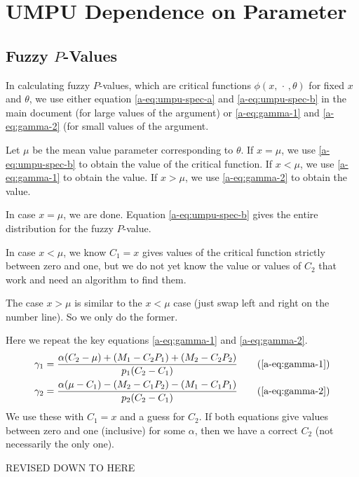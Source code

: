 \documentclass[11pt]{article}
\newcommand{\fatdot}{\,\cdot\,}
\newcommand{\REVISED}{\begin{center} \LARGE REVISED DOWN TO HERE \end{center}}
\begin{document}
\section{UMPU Dependence on Parameter}

\subsection{Fuzzy $P$-Values}

In calculating fuzzy $P$-values, which are critical functions
$\phi(x, \fatdot, \theta)$ for fixed $x$ and $\theta$,
we use either equation \eqref{a-eq:umpu-spec-a} and \eqref{a-eq:umpu-spec-b}
in the main document (for large values of the argument) or
\eqref{a-eq:gamma-1} and \eqref{a-eq:gamma-2} (for small values of the
argument.

Let $\mu$ be the mean value parameter corresponding to $\theta$.
If $x = \mu$, we use \eqref{a-eq:umpu-spec-b} to obtain the value
of the critical function.
If $x < \mu$, we use \eqref{a-eq:gamma-1} to obtain the value.
If $x > \mu$, we use \eqref{a-eq:gamma-2} to obtain the value.

In case $x = \mu$, we are done.  Equation \eqref{a-eq:umpu-spec-b} gives
the entire distribution for the fuzzy $P$-value.

In case $x < \mu$, we know $C_1 = x$ gives values of the critical function
strictly between zero and one, but we do not yet know the value or values
of $C_2$ that work and need an algorithm to find them.

The case $x > \mu$ is similar to the $x < \mu$ case (just swap left and
right on the number line).  So we only do the former.

Here we repeat the key equations
\eqref{a-eq:gamma-1} and \eqref{a-eq:gamma-2}.
\begin{align}
   \gamma_1
   & =
   \frac{\alpha (C_2 - \mu) + (M_1 - C_2 P_1) + (M_2 - C_2 P_2)}
   {p_1 (C_2 - C_1)}
   \tag{\ref{a-eq:gamma-1}}
   \\
   \gamma_2
   & =
   \frac{\alpha (\mu - C_1) - (M_2 - C_1 P_2) - (M_1 - C_1 P_1)}
   {p_2 (C_2 - C_1)}
   \tag{\ref{a-eq:gamma-2}}
\end{align}
We use these with $C_1 = x$ and a guess for $C_2$.  If both equations
give values between zero and one (inclusive) for some $\alpha$,
then we have a correct $C_2$ (not necessarily the only one).


\REVISED
\end{document}
